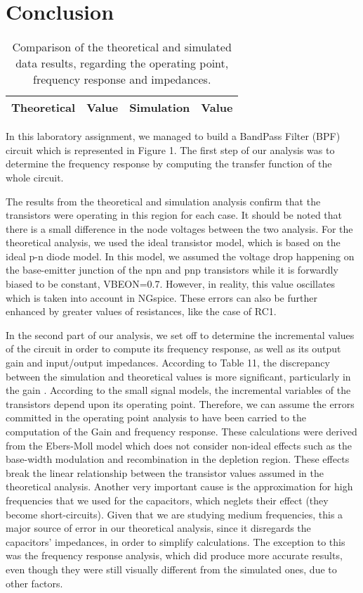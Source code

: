 \section{Conclusion}
\label{sec:conclusion}
\begin{table}[!h]
  \centering
  \begin{tabular}{c c c c}
    \hline    
    {\bf Theoretical} & {\bf Value} & {\bf Simulation} & {\bf Value}\\ \hline
     
  \end{tabular}
  \caption{Comparison of the theoretical and simulated data results, regarding the operating point, frequency response and impedances.}
  \label{tab:comp}
\end{table}

In this laboratory assignment, we managed to build a BandPass Filter (BPF) circuit which is represented in Figure 1. The first step of our analysis was to determine the frequency response by computing the transfer function of the whole circuit.

 The results from the theoretical and simulation analysis confirm that the transistors were operating in this region for each case. It should be noted that there is a small difference in the node voltages between the two analysis. For the theoretical analysis, we used the ideal transistor model, which is based on the ideal p-n diode model. In this model, we assumed the voltage drop happening on the base-emitter junction of the npn and pnp transistors while it is forwardly biased to be constant, VBEON=0.7. However, in reality, this value oscillates which is taken into account in NGspice. These errors can also be further enhanced by greater values of resistances, like the case of RC1.

In the second part of our analysis, we set off to determine the incremental values of the circuit in order to compute its frequency response, as well as its output gain and input/output impedances. According to Table 11, the discrepancy between the simulation and theoretical values is more significant, particularly in the gain . According to the small signal models, the incremental variables of the transistors depend upon its operating point. Therefore, we can assume the errors committed in the operating point analysis to have been carried to the computation of the Gain and frequency response. These calculations were derived from the Ebers-Moll model which does not consider non-ideal effects such as the base-width modulation and recombination in the depletion region. These effects break the linear relationship between the transistor values assumed in the theoretical analysis. Another very important cause is the approximation for high frequencies that we used for the capacitors, which neglets their effect (they become short-circuits). Given that we are studying medium frequencies, this a major source of error in our theoretical analysis, since it disregards the capacitors' impedances, in order to simplify calculations. The exception to this was the frequency response analysis, which did produce more accurate results, even though they were still visually different from the simulated ones, due to other factors.

